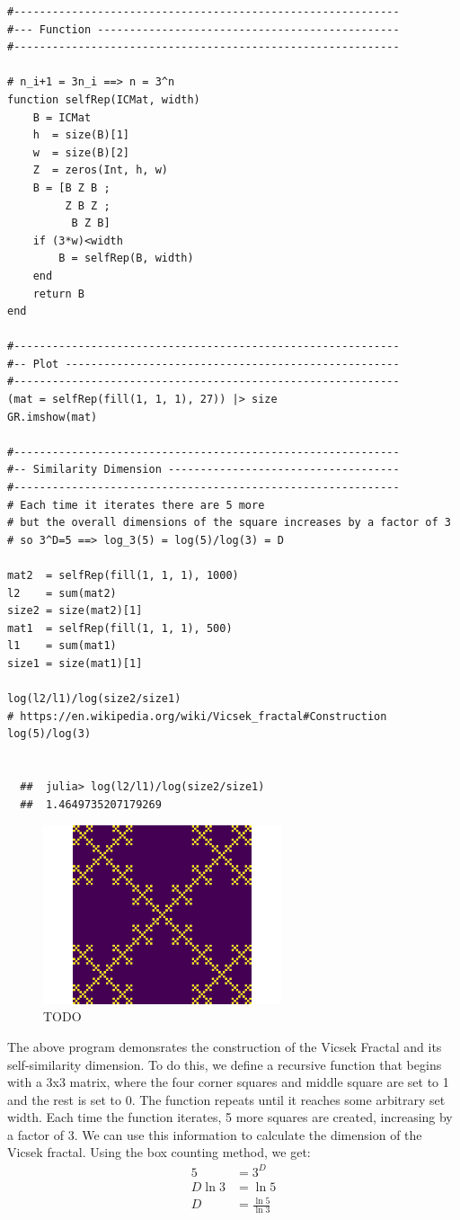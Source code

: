 \documentclass[11pt]{article}
\begin{document}
\begin{verbatim}
#------------------------------------------------------------
#--- Function -----------------------------------------------
#------------------------------------------------------------

# n_i+1 = 3n_i ==> n = 3^n
function selfRep(ICMat, width)
    B = ICMat
    h  = size(B)[1]
    w  = size(B)[2]
    Z  = zeros(Int, h, w)
    B = [B Z B ;
         Z B Z ;
          B Z B]
    if (3*w)<width
        B = selfRep(B, width)
    end
    return B
end

#------------------------------------------------------------
#-- Plot ----------------------------------------------------
#------------------------------------------------------------
(mat = selfRep(fill(1, 1, 1), 27)) |> size
GR.imshow(mat)

#------------------------------------------------------------
#-- Similarity Dimension ------------------------------------
#------------------------------------------------------------
# Each time it iterates there are 5 more
# but the overall dimensions of the square increases by a factor of 3
# so 3^D=5 ==> log_3(5) = log(5)/log(3) = D

mat2  = selfRep(fill(1, 1, 1), 1000)
l2    = sum(mat2)
size2 = size(mat2)[1]
mat1  = selfRep(fill(1, 1, 1), 500)
l1    = sum(mat1)
size1 = size(mat1)[1]

log(l2/l1)/log(size2/size1)
# https://en.wikipedia.org/wiki/Vicsek_fractal#Construction
log(5)/log(3)


  ##  julia> log(l2/l1)/log(size2/size1)
  ##  1.4649735207179269
\end{verbatim}

\begin{figure}
\centering
\includegraphics[width=7cm]{media/Vicsek-Fractal.png}
\caption{\label{vicsek-fractal-julia}TODO}
\end{figure}


The above program demonsrates the construction of the Vicsek Fractal and its self-similarity dimension. To do this, we define a recursive function that begins with a 3x3 matrix, where the four corner squares and middle square are set to 1 and the rest is set to 0. The function repeats until it reaches some arbitrary set width. Each time the function iterates, 5 more squares are created, increasing by a factor of 3. We can use this information to calculate the dimension of the Vicsek fractal.
Using the box counting method, we get:
\begin{align*}
5 &= 3^D\\
D\ln{3} &= \ln{5}\\
D &= \frac{\ln{5}}{\ln{3}}
\end{align*}
\end{document}
